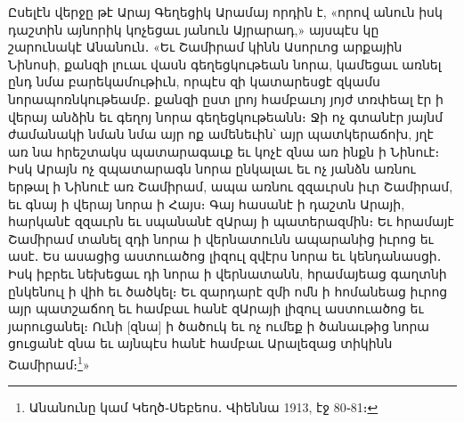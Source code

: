 \documentclass{article}
\begin{document}
{Ըսելէն վերջը թէ Արայ Գեղեցիկ Արամայ որդին է, «որով անուն իսկ դաշտին այնորիկ կոչեցաւ յանուն Այրարադ,» այսպէս կը շարունակէ Անանուն․ «Եւ Շամիրամ կինն Ասորւոց արքային Նինոսի, քանզի լուաւ վասն գեղեցկութեան նորա, կամեցաւ առնել ընդ նմա բարեկամութիւն, որպէս զի կատարեսցէ զկամս նորապոռնկութեամբ․ քանզի ըստ լրոյ համբաւոյ յոյժ տռփեալ էր ի վերայ անձին եւ գեղոյ նորա գեղեցկութեանն։ Ջի ոչ գտանէր յայնմ ժամանակի նման նմա այր ոք ամենեւին՝ այր պատկերաճոխ, յղէ առ նա հրեշտակս պատարագաւք եւ կոչէ զնա առ ինքն ի Նինուէ։ Իսկ Արայն ոչ զպատարագն նորա ընկալաւ եւ ոչ յանձն առնու երթալ ի Նինուէ առ Շամիրամ, ապա առնու զզաւրսն իւր Շամիրամ, եւ գնայ ի վերայ նորա ի Հայս։ Գայ հասանէ ի դաշտն Արայի, հարկանէ զզաւրն եւ սպանանէ զԱրայ ի պատերազմին։ Եւ հրամայէ Շամիրամ տանել զդի նորա ի վերնատունն ապարանից իւրոց եւ ասէ․ Ես ասացից աստուածոց լիզուլ զվէրս նորա եւ կենդանասցի․ Իսկ իբրեւ նեխեցաւ դի նորա ի վերնատանն, հրամայեաց գաղտնի ընկենուլ ի վիհ եւ ծածկել։ Եւ զարդարէ զմի ոմն ի հոմանեաց իւրոց այր պատշաճող եւ համբաւ հանէ զԱրայի լիզուլ աստուածոց եւ յարուցանել։ Ունի [զնա] ի ծածուկ եւ ոչ ումեք ի ծանաւթից նորա ցուցանէ զնա եւ այնպէս հանէ համբաւ Արալեզաց տիկինն Շամիրամ։\footnote{Անանունը կամ Կեղծ֊Սեբեոս․ Վիեննա 1913, էջ 80֊81։}»

}
\end{document}
